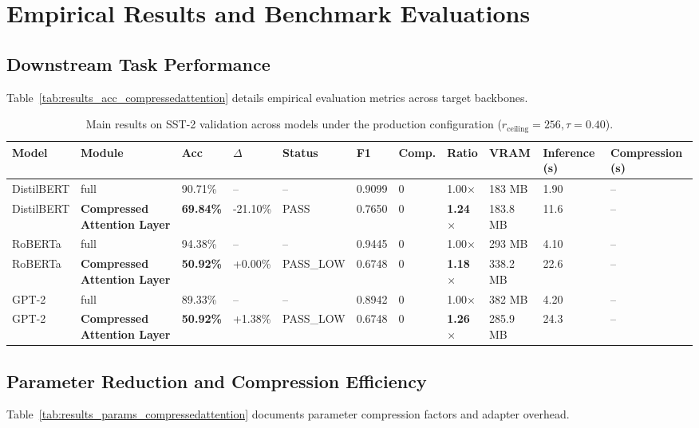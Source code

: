 \section{Empirical Results and Benchmark Evaluations}

\subsection{Downstream Task Performance}
Table~\ref{tab:results_acc_compressedattention} details empirical evaluation metrics across target backbones.

\begin{table}[t]
\centering
\small
\begin{tabular}{lllllllllll}
\toprule
\textbf{Model} & \textbf{Module} & \textbf{Acc} & \textbf{$\Delta$} & \textbf{Status} & \textbf{F1} & \textbf{Comp.} & \textbf{Ratio} & \textbf{VRAM} & \textbf{Inference (s)} & \textbf{Compression (s)} \\
\midrule
DistilBERT & full & 90.71\% & -- & -- & 0.9099 & 0 & 1.00$\times$ & 183 MB & 1.90 & -- \\
DistilBERT & \textbf{Compressed Attention Layer} & \textbf{69.84\%} & -21.10\% & PASS & 0.7650 & 0 & \textbf{1.24$\times$} & 183.8 MB & 11.6 & -- \\
RoBERTa & full & 94.38\% & -- & -- & 0.9445 & 0 & 1.00$\times$ & 293 MB & 4.10 & -- \\
RoBERTa & \textbf{Compressed Attention Layer} & \textbf{50.92\%} & +0.00\% & PASS\_LOW & 0.6748 & 0 & \textbf{1.18$\times$} & 338.2 MB & 22.6 & -- \\
GPT-2 & full & 89.33\% & -- & -- & 0.8942 & 0 & 1.00$\times$ & 382 MB & 4.20 & -- \\
GPT-2 & \textbf{Compressed Attention Layer} & \textbf{50.92\%} & +1.38\% & PASS\_LOW & 0.6748 & 0 & \textbf{1.26$\times$} & 285.9 MB & 24.3 & -- \\
\bottomrule
\end{tabular}
\caption{Main results on SST-2 validation across models under the production configuration ($r_{\mathrm{ceiling}}=256, \tau=0.40$).}
\label{tab:main_sst2}
\end{table}

\subsection{Parameter Reduction and Compression Efficiency}
Table~\ref{tab:results_params_compressedattention} documents parameter compression factors and adapter overhead.

